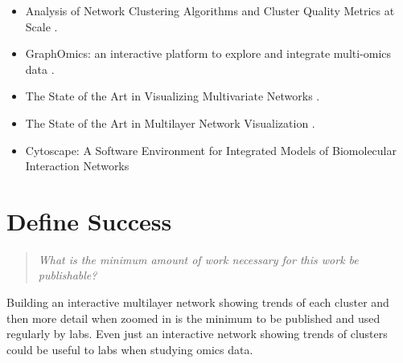 \documentclass{proc}
\begin{document}
\begin{itemize}
    \item Analysis of Network Clustering Algorithms and Cluster Quality Metrics at Scale \cite{Emmons2016}.
    \item GraphOmics: an interactive platform to explore and integrate multi-omics data \cite{Wandy2021}.
    \item The State of the Art in Visualizing Multivariate Networks \cite{Nobre2019}.
    \item The State of the Art in Multilayer Network Visualization \cite{McGee2019}.
    \item Cytoscape: A Software Environment for Integrated Models of Biomolecular Interaction Networks \cite{Shannon2003}
\end{itemize}

\section{Define Success}
\begin{quote}
\textit{What is the minimum amount of work necessary for this work be publishable?}
\end{quote}

Building an interactive multilayer network showing trends of each cluster and then more detail when zoomed in is the minimum to be published and used regularly by labs. Even just an interactive network showing trends of clusters could be useful to labs when studying omics data.



\end{document}

